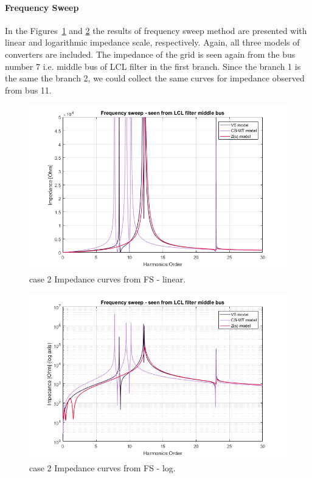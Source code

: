 \documentclass[12pt]{report} %
\begin{document}
\paragraph{Frequency Sweep}
In the Figures~\ref{fig:case2fslin} and \ref{fig:case2fslog} the results of frequency sweep method are presented with linear and logarithmic impedance scale, respectively. Again, all three models of converters are included. The impedance of the grid is seen again from the bus number 7 i.e. middle bus of LCL filter in the first branch. Since the branch 1 is the same the branch 2, we could collect the same curves for impedance observed from bus 11.

\begin{figure}[htb]
	\centering
	\includegraphics[width=1\textwidth]{img/Case2/Case2_FS_lin.png}
  	\caption{case 2 Impedance curves from FS - linear.}
  	\label{fig:case2fslin}
\end{figure}
\FloatBarrier

\begin{figure}[htb]
	\centering
	\includegraphics[width=1\textwidth]{img/Case2/Case2_FS_log.png}
  	\caption{case 2 Impedance curves from FS - log.}
  	\label{fig:case2fslog}
\end{figure}
\FloatBarrier
\end{document}

